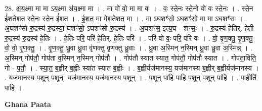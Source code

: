 \documentclass[17pt]{extarticle}
\begin{document}
28. अ॒य॒क्ष्मा मा मा ऽय॒क्ष्मा अ॑य॒क्ष्मा मा । . मा वो॑ वो॒ मा मा वः॑ । . वः॒ स्ते॒नः स्ते॒नो वो॑ वः स्ते॒नः । . स्ते॒न ई॑शतेशत स्ते॒नः स्ते॒न ई॑शत । . ई॒श॒त॒ मा मेश॑तेशत॒ मा । . मा ऽघशꣳ॑सो॒ ऽघशꣳ॑सो॒ मा मा ऽघशꣳ॑सः । . अ॒घशꣳ॑सो रु॒द्रस्य॑ रु॒द्रस्या॒ घशꣳ॑सो॒ ऽघशꣳ॑सो रु॒द्रस्य॑ । . अ॒घशꣳ॑स॒ इत्य॒घ - शꣳ॒॒सः॒ । . रु॒द्रस्य॑ हे॒तिर्. हे॒ती रु॒द्रस्य॑ रु॒द्रस्य॑ हे॒तिः । . हे॒तिः परि॒ परि॑ हे॒तिर्. हे॒तिः परि॑ । . परि॑ वो वः॒ परि॒ परि॑ वः । . वो॒ वृ॒ण॒क्तु॒ वृ॒ण॒क्तु॒ वो॒ वो॒ वृ॒ण॒क्तु॒ । . वृ॒ण॒क्तु॒ ध्रु॒वा ध्रु॒वा वृ॑णक्तु वृणक्तु ध्रु॒वाः । . ध्रु॒वा अ॒स्मिन् न॒स्मिन् ध्रु॒वा ध्रु॒वा अ॒स्मिन्न् । . अ॒स्मिन् गोप॑तौ॒ गोप॑ता व॒स्मिन् न॒स्मिन् गोप॑तौ । . गोप॑तौ स्यात स्यात॒ गोप॑तौ॒ गोप॑तौ स्यात । . गोप॑ता॒विति॒ गो - प॒तौ॒ । . स्या॒त॒ ब॒ह्वीर् ब॒ह्वीः स्या॑त स्यात ब॒ह्वीः । . ब॒ह्वीर्यज॑मानस्य॒ यज॑मानस्य ब॒ह्वीर् ब॒ह्वीर्यज॑मानस्य । . यज॑मानस्य प॒शून् प॒शून्. यज॑मानस्य॒ यज॑मानस्य प॒शून् । . प॒शून् पा॑हि पाहि प॒शून् प॒शून् पा॑हि । . पा॒हीति॑ पाहि । \newline

\textbf{Ghana Paata } \newline
\end{document}
